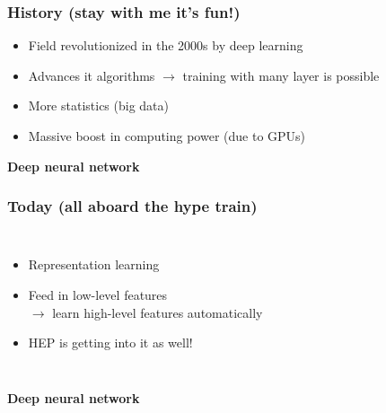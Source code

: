 \begin{frame}
    \frametitle{History (stay with me it's fun!)}
    \begin{center}
      \begin{itemize}
        \item Field revolutionized in the 2000s by deep learning
        \item Advances it algorithms $\rightarrow$ training with many layer is possible
        \item More statistics (big data)
        \item Massive boost in computing power (due to GPUs)
      \end{itemize}


      \vspace{1em}
      \textbf{Deep neural network}


    \end{center}
\end{frame}

\begin{frame}
  \frametitle{Today (all aboard the hype train)}
    \begin{center}
      \begin{columns}
      \begin{itemize}
        \item Representation learning
        \item Feed in low-level features \\ $\rightarrow$ learn high-level features automatically
        \item HEP is getting into it as well!
      \end{itemize}
      \end{columns}


      \vspace{0.5em}
      \textbf{Deep neural network}



    \end{center}
\end{frame}

